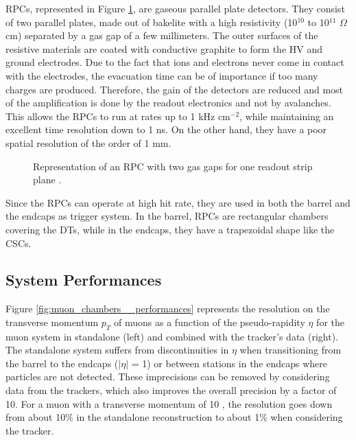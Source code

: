     			RPCs, represented in Figure \ref{fig:muon_chambers__rpc}, are gaseous parallel plate detectors. They consist of two parallel plates, made out of bakelite with a high resistivity (10$ ^{10} $ to 10$ ^{11} $ $ \Omega $ cm) separated by a gas gap of a few millimeters. The outer surfaces of the resistive materials are coated with conductive graphite to form the HV and ground electrodes. Due to the fact that ions and electrons never come in contact with the electrodes, the evacuation time can be of importance if too many charges are produced. Therefore, the gain of the detectors are reduced and most of the amplification is done by the readout electronics and not by avalanches. This allows the RPCs to run at rates up to 1 kHz cm$ ^{-2} $, while maintaining an excellent time resolution down to 1 ns. On the other hand, they have a poor spatial resolution of the order of 1 mm. \\

    			\begin{figure}[h!]
    				\centering
    				\caption{Representation of an RPC with two gas gaps for one readout strip plane \Cite{These_Karol}.}
    				\label{fig:muon_chambers__rpc}
    			\end{figure}

    			Since the RPCs can operate at high hit rate, they are used in both the barrel and the endcaps as trigger system. In the barrel, RPCs are rectangular chambers covering the DTs, while in the endcaps, they have a trapezoidal shape like the CSCs.

    		\subsection{System Performances}
    		\label{sec:muon_chambers__system_performances}

    			Figure \ref{fig:muon_chambers__performances} represents the resolution on the transverse momentum $ p_T $ of muons as a function of the pseudo-rapidity $ \eta $ for the muon system in standalone (left) and combined with the tracker's data (right). The standalone system suffers from discontinuities in $ \eta $ when transitioning from the barrel to the endcaps ($ | \eta | $ = 1) or between stations in the endcaps where particles are not detected. These imprecisions can be removed by considering data from the trackers, which also improves the overall precision by a factor of 10. For a muon with a transverse momentum of 10 \GeVc{}, the resolution goes down from about 10\% in the standalone reconstruction to about 1\% when considering the tracker.


